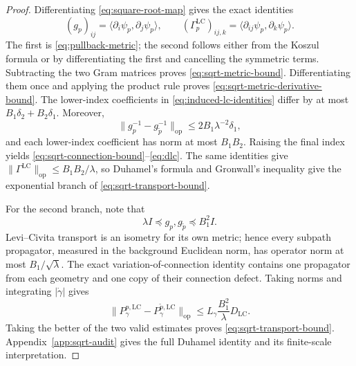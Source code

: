 \documentclass[11pt]{article}
\theoremstyle{definition}
\theoremstyle{remark}
\newcommand{\LC}{\mathrm{LC}}
\newcommand{\op}{\mathrm{op}}
\begin{document}
\begin{proof}
Differentiating \eqref{eq:square-root-map} gives the exact identities
\begin{equation}
    (g_p)_{ij}=\langle\partial_i\psi_p,\partial_j\psi_p\rangle,
    \qquad
    (\Gamma_p^{\LC})_{ij,k}
    =\langle\partial_{ij}\psi_p,\partial_k\psi_p\rangle.
    \label{eq:induced-lc-identities}
\end{equation}
The first is \eqref{eq:pullback-metric}; the second follows either from the Koszul formula or by differentiating the first and cancelling the symmetric terms. Subtracting the two Gram matrices proves \eqref{eq:sqrt-metric-bound}. Differentiating them once and applying the product rule proves \eqref{eq:sqrt-metric-derivative-bound}. The lower-index coefficients in \eqref{eq:induced-lc-identities} differ by at most $B_1\delta_2+B_2\delta_1$. Moreover,
\begin{equation}
    \|g_p^{-1}-g_{\widetilde p}^{-1}\|_{\op}
    \le 2B_1\lambda^{-2}\delta_1,
\end{equation}
and each lower-index coefficient has norm at most $B_1B_2$. Raising the final index yields \eqref{eq:sqrt-connection-bound}--\eqref{eq:dlc}. The same identities give $\|\Gamma^{\LC}\|_{\op}\le B_1B_2/\lambda$, so Duhamel's formula and Gronwall's inequality give the exponential branch of \eqref{eq:sqrt-transport-bound}.

For the second branch, note that
\begin{equation}
    \lambda I\preceq g_p,g_{\widetilde p}\preceq B_1^2I.
\end{equation}
Levi--Civita transport is an isometry for its own metric; hence every subpath propagator, measured in the background Euclidean norm, has operator norm at most $B_1/\sqrt\lambda$. The exact variation-of-connection identity contains one propagator from each geometry and one copy of their connection defect. Taking norms and integrating $|\dot\gamma|$ gives
\begin{equation}
    \|P_\gamma^{p,\LC}-P_\gamma^{\widetilde p,\LC}\|_{\op}
    \le L_\gamma\frac{B_1^2}{\lambda}D_{\LC}.
\end{equation}
Taking the better of the two valid estimates proves \eqref{eq:sqrt-transport-bound}. Appendix~\ref{app:sqrt-audit} gives the full Duhamel identity and its finite-scale interpretation.
\end{proof}
\end{document}
